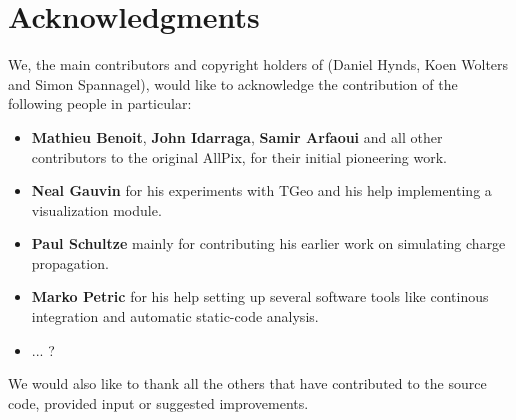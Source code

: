 \section{Acknowledgments}
We, the main contributors and copyright holders of \apsq (Daniel Hynds, Koen Wolters and Simon Spannagel), would like to acknowledge the contribution of the following people in particular:
\begin{itemize}
\item \textbf{Mathieu Benoit}, \textbf{John Idarraga}, \textbf{Samir Arfaoui} and all other contributors to the original AllPix, for their initial pioneering work.
\item \textbf{Neal Gauvin} for his experiments with TGeo and his help implementing a visualization module.
\item \textbf{Paul Schultze} mainly for contributing his earlier work on simulating charge propagation.
\item \textbf{Marko Petric} for his help setting up several software tools like continous integration and automatic static-code analysis.
\item \todo ... ? \todo
\end{itemize}
We would also like to thank all the others that have contributed to the source code, provided input or suggested improvements. 
